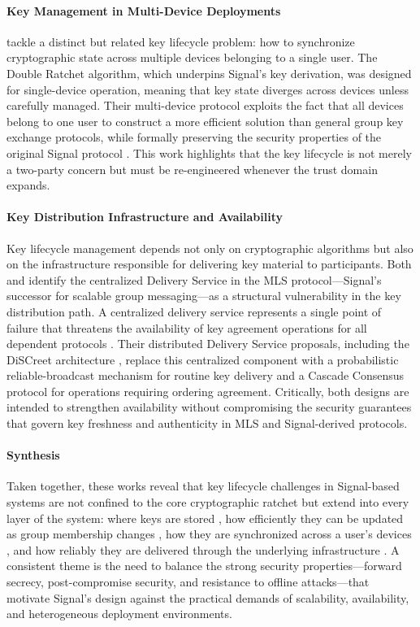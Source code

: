 \paragraph{Key Management in Multi-Device Deployments}
\textcite{campion2020} tackle a distinct but related key lifecycle problem: how to synchronize cryptographic state across multiple devices belonging to a single user. The Double Ratchet algorithm, which underpins Signal's key derivation, was designed for single-device operation, meaning that key state diverges across devices unless carefully managed. Their multi-device protocol exploits the fact that all devices belong to one user to construct a more efficient solution than general group key exchange protocols, while formally preserving the security properties of the original Signal protocol \parencite{campion2020}. This work highlights that the key lifecycle is not merely a two-party concern but must be re-engineered whenever the trust domain expands.

\paragraph{Key Distribution Infrastructure and Availability}
Key lifecycle management depends not only on cryptographic algorithms but also on the infrastructure responsible for delivering key material to participants. Both \textcite{paillat2024} and \textcite{paillat2025} identify the centralized Delivery Service in the MLS protocol—Signal's successor for scalable group messaging—as a structural vulnerability in the key distribution path. A centralized delivery service represents a single point of failure that threatens the availability of key agreement operations for all dependent protocols \parencite{paillat2024}. Their distributed Delivery Service proposals, including the DiSCreet architecture \parencite{paillat2025}, replace this centralized component with a probabilistic reliable-broadcast mechanism for routine key delivery and a Cascade Consensus protocol for operations requiring ordering agreement. Critically, both designs are intended to strengthen availability without compromising the security guarantees that govern key freshness and authenticity in MLS and Signal-derived protocols.

\paragraph{Synthesis}
Taken together, these works reveal that key lifecycle challenges in Signal-based systems are not confined to the core cryptographic ratchet but extend into every layer of the system: where keys are stored \parencite{almari2024}, how efficiently they can be updated as group membership changes \parencite{emura2023}, how they are synchronized across a user's devices \parencite{campion2020}, and how reliably they are delivered through the underlying infrastructure \parencite{paillat2024, paillat2025}. A consistent theme is the need to balance the strong security properties—forward secrecy, post-compromise security, and resistance to offline attacks—that motivate Signal's design against the practical demands of scalability, availability, and heterogeneous deployment environments.

